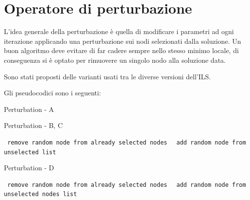 \documentclass[11pt]{article}
\begin{document}
\pagebreak

\section{Operatore di perturbazione}

L'idea generale della perturbazione è quella di modificare i parametri ad ogni iterazione applicando una perturbazione sui nodi selezionati dalla soluzione.
Un buon algoritmo deve evitare di far cadere sempre nello stesso minimo locale, di conseguenza si è optato per rimuovere un singolo nodo alla soluzione data.

Sono stati proposti delle varianti usati tra le diverse versioni dell'ILS. 

Gli pseudocodici sono i seguenti:

\begin{algorithm}
\caption{Perturbation - A}
\begin{algorithmic}
\end{algorithmic}
\end{algorithm}


\begin{algorithm}
    \caption{Perturbation - B, C}
    \begin{algorithmic}
    
        \State \texttt{
            remove random node from already selected nodes
        }
        \State \texttt{
            add random node from unselected list
        }
    \EndFor
    
\end{algorithmic}
\end{algorithm}


\begin{algorithm}
    \caption{Perturbation - D}
    \begin{algorithmic}

        \State \texttt{
            remove random node from already selected nodes
        }
    \EndFor
            \State \texttt{
                add random node from unselected nodes list
            }
        \EndFor
    \EndIf
\end{algorithmic}
\end{algorithm}
\end{document}
